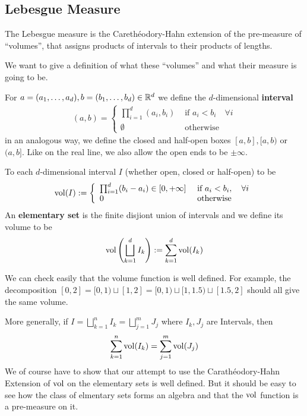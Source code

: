 \subsection{Lebesgue Measure}
The Lebesgue measure is the Carethéodory-Hahn extension of the pre-measure of ``volumes'', that assigns products of intervals to their products of lengths.

We want to give a definition of what these ``volumes'' and what their measure is going to be.
\begin{dfn}[]
  For $a = (a_{1}, \ldots, a_{d}), b = (b_{1}, \ldots, b_{d}) \in \mathbb{R}^{d}$ we define the $d$-dimensional \textbf{interval}
  \begin{align*}
    (a,b)
    =
    \left\{\begin{array}{ll}
        \prod_{i=1}^{d}(a_i,b_i) & \text{ if } a_i < b_i \quad \forall i\\
       \emptyset & \text{ otherwise}
    \end{array} \right.
  \end{align*}
  in an analogous way, we define the closed and half-open boxes $[a,b], [a,b)$ or $(a,b]$.
  Like on the real line, we also allow the open ends to be $\pm \infty$.

  To each $d$-dimensional interval $I$ (whether open, closed or half-open) to be
  \begin{align*}
    \operatorname{vol}(I) :=
    \left\{\begin{array}{ll}
    \prod_{i=1}^{d}(b_i - a_i) \in [0,+\infty] 
       &
    \text{ if } a_i < b_i, \quad \forall i
       \\
      0 & \text{ otherwise}
    \end{array} \right.
  \end{align*}
  An \textbf{elementary set} is the finite disjiont union of intervals and we define its volume to be
  \begin{align*}
    \operatorname{vol}\left(
      \bigsqcup_{k=1}^{d}I_k 
    \right)
      :=
      \sum_{k=1}^{d}\operatorname{vol}(I_k)
  \end{align*}
\end{dfn}
\begin{rem}[]
  We can check easily that the volume function is well defined.
  For example, the decomposition $[0,2] = [0,1) \sqcup [1,2] = [0,1) \sqcup [1,1.5) \sqcup [1.5,2]$ should all give the same volume.

  More generally, if $I= \bigsqcup_{k=1}^{n}I_k = \bigsqcup_{j=1}^m J_j$ where $I_k,J_j$ are Intervals, then
  \begin{align*}
    \sum_{k=1}^{n}\operatorname{vol}(I_k) = \sum_{j=1}^{m} \operatorname{vol}(J_j)
  \end{align*}
  We of course have to show that our attempt to use the Carathéodory-Hahn Extension of $\operatorname{vol}$ on the elementary sets is well defined. 
  But it should be easy to see how the class of elmentary sets forms an algebra and that the $\operatorname{vol}$ function is a pre-measure on it.
\end{rem}

